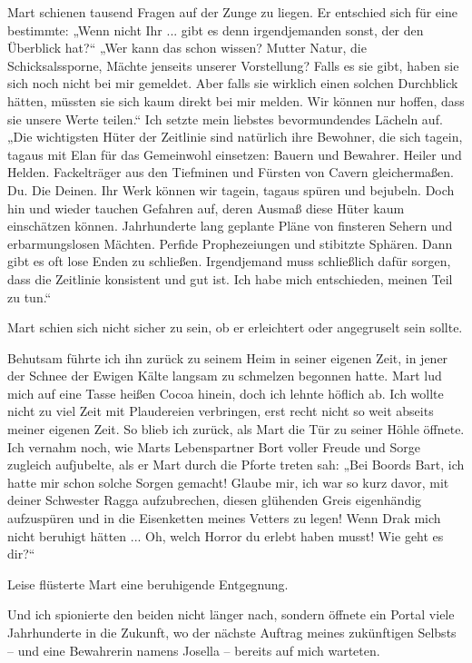 \documentclass[10pt, a4paper, oneside]{book}
\begin{document}
Mart schienen tausend Fragen auf der Zunge zu liegen. Er entschied sich für eine bestimmte: „Wenn nicht Ihr ... gibt es denn irgendjemanden sonst, der den Überblick hat?“ „Wer kann das schon wissen? Mutter Natur, die Schicksalssporne, Mächte jenseits unserer Vorstellung? Falls es sie gibt, haben sie sich noch nicht bei mir gemeldet. Aber falls sie wirklich einen solchen Durchblick hätten, müssten sie sich kaum direkt bei mir melden. Wir können nur hoffen, dass sie unsere Werte teilen.“ Ich setzte mein liebstes bevormundendes Lächeln auf. „Die wichtigsten Hüter der Zeitlinie sind natürlich ihre Bewohner, die sich tagein, tagaus mit Elan für das Gemeinwohl einsetzen: Bauern und Bewahrer. Heiler und Helden. Fackelträger aus den Tiefminen und Fürsten von Cavern gleichermaßen. Du. Die Deinen. Ihr Werk können wir tagein, tagaus spüren und bejubeln. Doch hin und wieder tauchen Gefahren auf, deren Ausmaß diese Hüter kaum einschätzen können. Jahrhunderte lang geplante Pläne von finsteren Sehern und erbarmungslosen Mächten. Perfide Prophezeiungen und stibitzte Sphären. Dann gibt es oft lose Enden zu schließen. Irgendjemand muss schließlich dafür sorgen, dass die Zeitlinie konsistent und gut ist. Ich habe mich entschieden, meinen Teil zu tun.“ 

Mart schien sich nicht sicher zu sein, ob er erleichtert oder angegruselt sein sollte.

Behutsam führte ich ihn zurück zu seinem Heim in seiner eigenen Zeit, in jener der Schnee der Ewigen Kälte langsam zu schmelzen begonnen hatte. Mart lud mich auf eine Tasse heißen Cocoa hinein, doch ich lehnte höflich ab. Ich wollte nicht zu viel Zeit mit Plaudereien verbringen, erst recht nicht so weit abseits meiner eigenen Zeit. So blieb ich zurück, als Mart die Tür zu seiner Höhle öffnete. Ich vernahm noch, wie Marts Lebenspartner Bort voller Freude und Sorge zugleich aufjubelte, als er Mart durch die Pforte treten sah: „Bei Boords Bart, ich hatte mir schon solche Sorgen gemacht! Glaube mir, ich war so kurz davor, mit deiner Schwester Ragga aufzubrechen, diesen glühenden Greis eigenhändig aufzuspüren und in die Eisenketten meines Vetters zu legen! Wenn Drak mich nicht beruhigt hätten ... Oh, welch Horror du erlebt haben musst! Wie geht es dir?“ 

Leise flüsterte Mart eine beruhigende Entgegnung.

Und ich spionierte den beiden nicht länger nach, sondern öffnete ein Portal viele Jahrhunderte in die Zukunft, wo der nächste Auftrag meines zukünftigen Selbsts – und eine Bewahrerin namens Josella – bereits auf mich warteten. 
\end{document}
